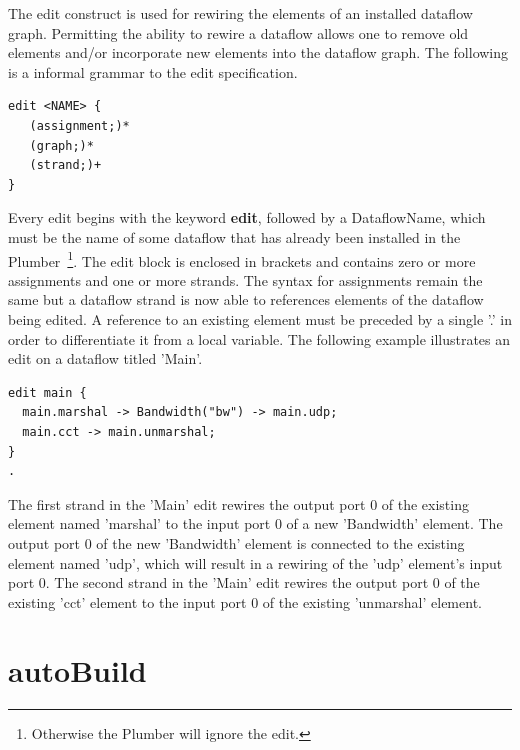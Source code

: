 \documentclass{article}
\begin{document}
The edit construct is used for rewiring the elements of an installed dataflow graph. 
Permitting the ability to rewire a dataflow allows one to remove old elements 
and/or incorporate new elements into the dataflow graph. The following is a 
informal grammar to the edit specification.

\begin{verbatim}
edit <NAME> {
   (assignment;)*
   (graph;)*
   (strand;)+
}
\end{verbatim}

Every edit begins with the keyword {\bf edit}, followed by a DataflowName, which
must be the name of some dataflow that has already been installed in the 
Plumber~\footnote{Otherwise the Plumber will ignore the edit.}. The edit
block is enclosed in brackets and contains zero or more assignments and one or
more strands. The syntax for assignments remain the same but a dataflow strand
is now able to references elements of the dataflow being edited. A reference
to an existing element must be preceded by a single '.' in order to differentiate 
it from a local variable. The following example illustrates an edit on a dataflow
titled 'Main'.

\begin{verbatim}
edit main {
  main.marshal -> Bandwidth("bw") -> main.udp;
  main.cct -> main.unmarshal;  
}
.
\end{verbatim}

The first strand in the 'Main' edit rewires the output port $0$ of the existing element
named 'marshal' to the input port $0$ of a new 'Bandwidth' element. 
The output port $0$ of the new 'Bandwidth' element is connected to the existing element
named 'udp', which will result in a rewiring of the 'udp' element's input port $0$. The
second strand in the 'Main' edit rewires the output port $0$ of the existing 'cct' element
to the input port $0$ of the existing 'unmarshal' element.


























\section{autoBuild}
\end{document}
